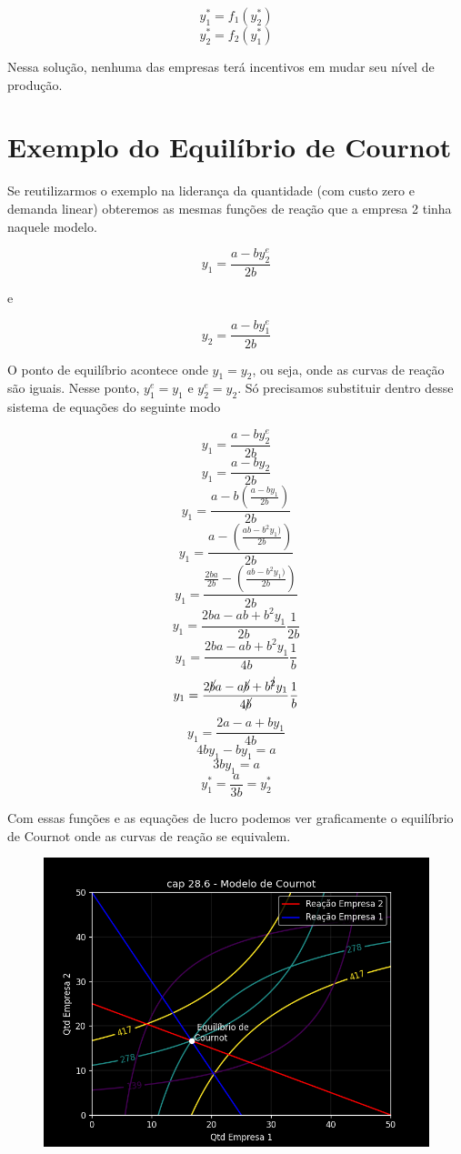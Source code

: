 \documentclass[a4paper,11pt,oneside]{book}
\theoremstyle{definition}
\theoremstyle{break}
\begin{document}
$$ y_1^* = f_1(y_2^*) $$
$$ y_2^* = f_2(y_1^*) $$

Nessa solução, nenhuma das empresas terá incentivos em mudar seu nível de produção.

\section{Exemplo do Equilíbrio de Cournot}

Se reutilizarmos o exemplo na liderança da quantidade (com custo zero e demanda linear) obteremos as mesmas funções de reação que a empresa 2 tinha naquele modelo.

$$ y_1 = \frac{a - by_2^e}{2b} $$

e

$$ y_2 = \frac{a - by_1^e}{2b} $$

O ponto de equilíbrio acontece onde $y_1 = y_2$, ou seja, onde as curvas de reação são iguais. Nesse ponto, $y_1^e = y_1$ e $y_2^e = y_2$. Só precisamos substituir dentro desse sistema de equações do seguinte modo

$$ y_1 = \frac{a - by_2^e}{2b} $$
$$ y_1 = \frac{a - by_2}{2b} $$
$$ y_1 = \frac{a - b(\frac{a - by_1}{2b})}{2b} $$
$$ y_1 = \frac{a - (\frac{ab - b^2y_1)}{2b})}{2b} $$
$$ y_1 = \frac{\frac{2ba}{2b} - (\frac{ab - b^2y_1)}{2b})}{2b} $$
$$ y_1 = \frac{2ba - ab + b^2y_1}{2b}\frac{1}{2b} $$
$$ y_1 = \frac{2ba - ab + b^2y_1}{4b}\frac{1}{b} $$
$$ y_1 = \frac{2\cancel{b}a - a\cancel{b} + b^{\cancel{2}}y_1}{4\cancel{b}}\frac{1}{b} $$
$$ y_1 = \frac{2a - a + by_1}{4b} $$
$$ 4by_1 - by_1 = a $$
$$ 3by_1 = a $$
$$ y_1^* = \frac{a}{3b} = y_2^* $$

Com essas funções e as equações de lucro podemos ver graficamente o equilíbrio de Cournot onde as curvas de reação se equivalem.

\begin{figure}[H]
	\centering
	\includegraphics[scale=0.75]{cap28_6-modelo_cournot.png}
\end{figure}
\end{document}
